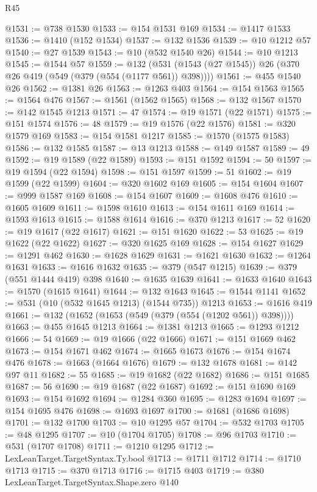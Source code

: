 \begin{lexlean}{R45}
\begin{coremodule}
@1531 := @738 @1530
@1533 := @154 @1531 @169
@1534 := @1417 @1533
@1536 := @1410 (@152 @1534)
@1537 := @132 @1536
@1539 := @10 @1212 @57
@1540 := @27 @1539
@1543 := @10 (@532 @1540 @26)
@1544 := @10 @1213
@1545 := @1544 @57
@1559 := @132 (@531 (@1543 (@27 @1545)) @26 (@370 @26 @419 (@549 (@379 (@554 (@1177 @561)) @398))))
@1561 := @455 @1540 @26
@1562 := @1381 @26
@1563 := @1263 @403
@1564 := @154 @1563
@1565 := @1564 @476
@1567 := @1561 (@1562 @1565)
@1568 := @132 @1567
@1570 := @142 @1545 @1213
@1571 := 47
@1574 := @19 @1571 (@22 @1571)
@1575 := @151 @1574
@1576 := 48
@1579 := @19 @1576 (@22 @1576)
@1581 := @320 @1579 @169
@1583 := @154 @1581 @1217
@1585 := @1570 (@1575 @1583)
@1586 := @132 @1585
@1587 := @13 @1213
@1588 := @149 @1587
@1589 := 49
@1592 := @19 @1589 (@22 @1589)
@1593 := @151 @1592
@1594 := 50
@1597 := @19 @1594 (@22 @1594)
@1598 := @151 @1597
@1599 := 51
@1602 := @19 @1599 (@22 @1599)
@1604 := @320 @1602 @169
@1605 := @154 @1604
@1607 := @999 @1587 @169
@1608 := @154 @1607
@1609 := @1608 @476
@1610 := @1605 @1609
@1611 := @1598 @1610
@1613 := @154 @1611 @169
@1614 := @1593 @1613
@1615 := @1588 @1614
@1616 := @370 @1213
@1617 := 52
@1620 := @19 @1617 (@22 @1617)
@1621 := @151 @1620
@1622 := 53
@1625 := @19 @1622 (@22 @1622)
@1627 := @320 @1625 @169
@1628 := @154 @1627
@1629 := @1291 @462
@1630 := @1628 @1629
@1631 := @1621 @1630
@1632 := @1264 @1631
@1633 := @1616 @1632
@1635 := @379 (@547 @1215)
@1639 := @379 (@551 @1444 @419) @398
@1640 := @1635 @1639
@1641 := @1633 @1640
@1643 := @1570 (@1615 @1641)
@1644 := @132 @1643
@1645 := @1544 @1141
@1652 := @531 (@10 (@532 @1645 @1213) (@1544 @735)) @1213
@1653 := @1616 @419
@1661 := @132 (@1652 (@1653 (@549 (@379 (@554 (@1202 @561)) @398))))
@1663 := @455 @1645 @1213
@1664 := @1381 @1213
@1665 := @1293 @1212
@1666 := 54
@1669 := @19 @1666 (@22 @1666)
@1671 := @151 @1669 @462
@1673 := @154 @1671 @462
@1674 := @1665 @1673
@1676 := @154 @1674 @476
@1678 := @1663 (@1664 @1676)
@1679 := @132 @1678
@1681 := @142 @97 @11
@1682 := 55
@1685 := @19 @1682 (@22 @1682)
@1686 := @151 @1685
@1687 := 56
@1690 := @19 @1687 (@22 @1687)
@1692 := @151 @1690 @169
@1693 := @154 @1692
@1694 := @1284 @360
@1695 := @1283 @1694
@1697 := @154 @1695 @476
@1698 := @1693 @1697
@1700 := @1681 (@1686 @1698)
@1701 := @132 @1700
@1703 := @10 @1295 @57
@1704 := @532 @1703
@1705 := @48 @1295
@1707 := @10 (@1704 @1705)
@1708 := @96 @1703
@1710 := @531 (@1707 @1708)
@1711 := @1210 @1295
@1712 := LexLeanTarget.TargetSyntax.Ty.bool
@1713 := @1711 @1712
@1714 := @1710 @1713
@1715 := @370 @1713
@1716 := @1715 @403
@1719 := @380 LexLeanTarget.TargetSyntax.Shape.zero @140

\end{coremodule}
\end{lexlean}
